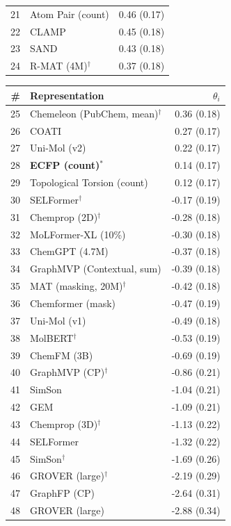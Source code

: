 \documentclass{article}
\begin{document}
\begin{table}[H]
\begin{tabular}[t]{@{}rlr@{}}
21 & Atom Pair (count)                  & 0.46 (0.17) \\
22 & CLAMP                              & 0.45 (0.18) \\
23 & SAND                               & 0.43 (0.18) \\
24 & R-MAT (4M)$^\dagger$               & 0.37 (0.18) \\
\bottomrule
\end{tabular}
\hfill
\begin{tabular}[t]{@{}rlr@{}}
\toprule
\# & Representation & $\theta_i$ \\
\midrule
25 & Chemeleon (PubChem, mean)$^\dagger$ & \phantom{-}0.36 (0.18) \\
26 & COATI                               & \phantom{-}0.27 (0.17) \\
27 & Uni-Mol (v2)                        & \phantom{-}0.22 (0.17) \\
28 & \textbf{ECFP (count)}$^\ast$                 & \phantom{-}0.14 (0.17) \\
29 & Topological Torsion (count)         & \phantom{-}0.12 (0.17) \\
30 & SELFormer$^\dagger$                 & -0.17 (0.19) \\
31 & Chemprop (2D)$^\dagger$             & -0.28 (0.18) \\
32 & MoLFormer-XL (10\%)                 & -0.30 (0.18) \\
33 & ChemGPT (4.7M)                      & -0.37 (0.18) \\
34 & GraphMVP (Contextual, sum)          & -0.39 (0.18) \\
35 & MAT (masking, 20M)$^\dagger$        & -0.42 (0.18) \\
36 & Chemformer (mask)                   & -0.47 (0.19) \\
37 & Uni-Mol (v1)                        & -0.49 (0.18) \\
38 & MolBERT$^\dagger$                   & -0.53 (0.19) \\
39 & ChemFM (3B)                         & -0.69 (0.19) \\
40 & GraphMVP (CP)$^\dagger$             & -0.86 (0.21) \\
41 & SimSon                              & -1.04 (0.21) \\
42 & GEM                                 & -1.09 (0.21) \\
43 & Chemprop (3D)$^\dagger$             & -1.13 (0.22) \\
44 & SELFormer                           & -1.32 (0.22) \\
45 & SimSon$^\dagger$                    & -1.69 (0.26) \\
46 & GROVER (large)$^\dagger$            & -2.19 (0.29) \\
47 & GraphFP (CP)                        & -2.64 (0.31) \\
48 & GROVER (large)                      & -2.88 (0.34) \\
\bottomrule
\end{tabular}
\end{table}
\end{document}
